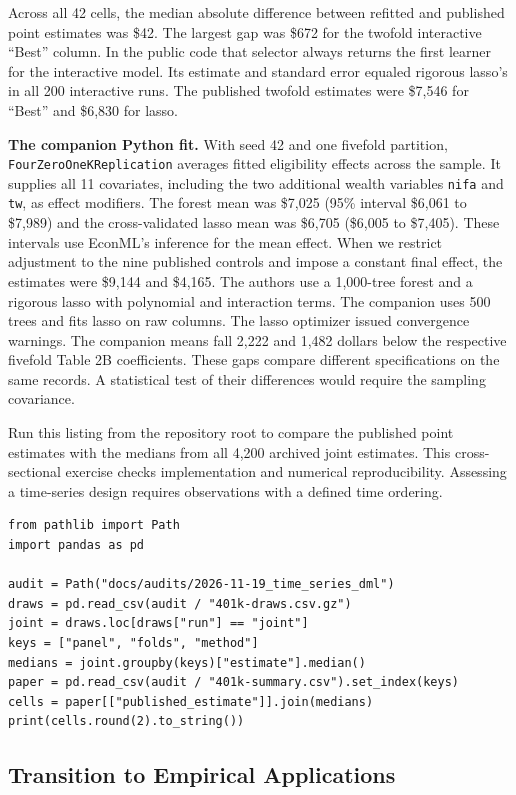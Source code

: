 Across all 42 cells, the median absolute difference between refitted and published point estimates was \$42. The largest gap was \$672 for the twofold interactive ``Best'' column. In the public code that selector always returns the first learner for the interactive model. Its estimate and standard error equaled rigorous lasso's in all 200 interactive runs. The published twofold estimates were \$7,546 for ``Best'' and \$6,830 for lasso.

\textbf{The companion Python fit.} With seed 42 and one fivefold partition, \texttt{FourZeroOneKReplication} averages fitted eligibility effects across the sample. It supplies all 11 covariates, including the two additional wealth variables \texttt{nifa} and \texttt{tw}, as effect modifiers. The forest mean was \$7,025 (95\% interval \$6,061 to \$7,989) and the cross-validated lasso mean was \$6,705 (\$6,005 to \$7,405). These intervals use EconML's inference for the mean effect. When we restrict adjustment to the nine published controls and impose a constant final effect, the estimates were \$9,144 and \$4,165. The authors use a 1,000-tree forest and a rigorous lasso with polynomial and interaction terms. The companion uses 500 trees and fits lasso on raw columns. The lasso optimizer issued convergence warnings. The companion means fall 2,222 and 1,482 dollars below the respective fivefold Table 2B coefficients. These gaps compare different specifications on the same records. A statistical test of their differences would require the sampling covariance.

Run this listing from the repository root to compare the published point estimates with the medians from all 4,200 archived joint estimates. This cross-sectional exercise checks implementation and numerical reproducibility. Assessing a time-series design requires observations with a defined time ordering.

\begin{verbatim}
from pathlib import Path
import pandas as pd

audit = Path("docs/audits/2026-11-19_time_series_dml")
draws = pd.read_csv(audit / "401k-draws.csv.gz")
joint = draws.loc[draws["run"] == "joint"]
keys = ["panel", "folds", "method"]
medians = joint.groupby(keys)["estimate"].median()
paper = pd.read_csv(audit / "401k-summary.csv").set_index(keys)
cells = paper[["published_estimate"]].join(medians)
print(cells.round(2).to_string())
\end{verbatim}

\subsection{Transition to Empirical Applications}

